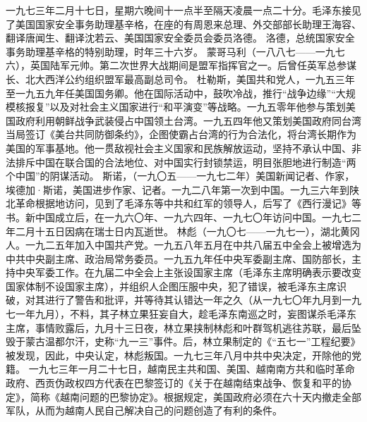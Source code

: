 \begin{maonote}
一九七三年二月十七日，星期六晚间十一点半至隔天凌晨一点二十分。毛泽东接见了美国国家安全事务助理基辛格，在座的有周恩来总理、外交部部长助理王海容、翻译唐闻生、翻译沈若云、美国国家安全委员会委员洛德。
洛德，总统国家安全事务助理基辛格的特别助理，时年三十六岁。
蒙哥马利（一八八七——一九七六），英国陆军元帅。第二次世界大战期间是盟军指挥官之一。后曾任英军总参谋长、北大西洋公约组织盟军最高副总司令。
杜勒斯，美国共和党人，一九五三年至一九五九年任美国国务卿。他在国际活动中，鼓吹冷战，推行“战争边缘”“大规模核报复”以及对社会主义国家进行“和平演变”等战略。一九五零年他参与策划美国政府利用朝鲜战争武装侵占中国领土台湾。一九五四年他又策划美国政府同台湾当局签订《美台共同防御条约》，企图使霸占台湾的行为合法化，将台湾长期作为美国的军事基地。他一贯敌视社会主义国家和民族解放运动，坚持不承认中国、非法排斥中国在联合国的合法地位、对中国实行封锁禁运，明目张胆地进行制造“两个中国”的阴谋活动。
斯诺，（一九〇五——一九七二年）美国新闻记者、作家，埃德加·斯诺，美国进步作家、记者。一九二八年第一次到中国。一九三六年到陕北革命根据地访问，见到了毛泽东等中共和红军的领导人，后写了《西行漫记》等书。新中国成立后，在一九六〇年、一九六四年、一九七〇年访问中国。一九七二年二月十五日因病在瑞士日内瓦逝世。
林彪（一九〇七——一九七一），湖北黄冈人。一九二五年加入中国共产党。一九五八年五月在中共八届五中全会上被增选为中共中央副主席、政治局常务委员。一九五九年任中央军委副主席、国防部长，主持中央军委工作。在九届二中全会上主张设国家主席（毛泽东主席明确表示要改变国家体制不设国家主席），并组织人企图压服中央，犯了错误，被毛泽东主席识破，对其进行了警告和批评，并等待其认错达一年之久（从一九七〇年九月到一九七一年九月），不料，其子林立果狂妄自大，趁毛泽东南巡之时，妄图谋杀毛泽东主席，事情败露后，九月十三日夜，林立果挟制林彪和叶群驾机逃往苏联，最后坠毁于蒙古温都尔汗，史称“九一三”事件。后，林立果制定的《“五七一”工程纪要》被发现，因此，中央认定，林彪叛国。一九七三年八月中共中央决定，开除他的党籍。
一九七三年一月二十七日，越南民主共和国、美国、越南南方共和临时革命政府、西贡伪政权四方代表在巴黎签订的《关于在越南结束战争、恢复和平的协定》，简称《越南问题的巴黎协定》。根据规定，美国政府必须在六十天内撤走全部军队，从而为越南人民自己解决自己的问题创造了有利的条件。


\end{maonote}

